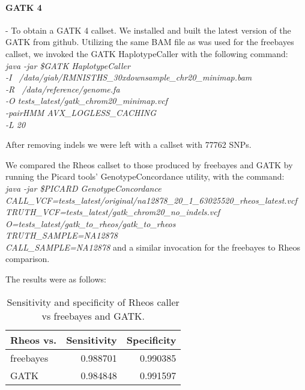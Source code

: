 \paragraph{GATK 4} - To obtain a GATK 4 callset. We installed and built the latest version of the GATK\autocite{mckenna2010genome} from github. Utilizing the same BAM file as was used for the freebayes callset, we invoked the GATK HaplotypeCaller with the following command:
\\
\emph{java -jar \$GATK HaplotypeCaller \\
-I ~/data/giab/RMNISTHS\_30xdownsample\_chr20\_minimap.bam\\
 -R ~/data/reference/genome.fa  \\
 -O tests\_latest/gatk\_chrom20\_minimap.vcf  \\
 -pairHMM AVX\_LOGLESS\_CACHING \\
 -L 20
}

After removing indels we were left with a callset with 77762 SNPs.

We compared the Rheos callset to those produced by freebayes and GATK by running the Picard\autocite{Picard2018toolkit} tools' GenotypeConcordance utility, with the command:\\
\bigskip
\emph{ java -jar \$PICARD GenotypeConcordance \\
CALL\_VCF=tests\_latest/original/na12878\_20\_1\_63025520\_rheos\_latest.vcf  \\
TRUTH\_VCF=tests\_latest/gatk\_chrom20\_no\_indels.vcf   \\
O=tests\_latest/gatk\_to\_rheos/gatk\_to\_rheos \\
TRUTH\_SAMPLE=NA12878 \\
CALL\_SAMPLE=NA12878}
\bigskip
and a similar invocation for the freebayes to Rheos comparison.

The results were as follows:

\begin{table}[!ht]
    \centering
    \caption{Sensitivity and specificity of Rheos caller vs freebayes and GATK.}
    \label{tab:rheos_vs_fb_and_gatk}
    {\begin{tabular}{l | r | r}
    \toprule
    Rheos vs. & Sensitivity & Specificity \\
    \midrule
    freebayes & 0.988701 & 0.990385\\
    GATK & 0.984848 & 0.991597\\
    \bottomrule
    \end{tabular}}
\end{table}

